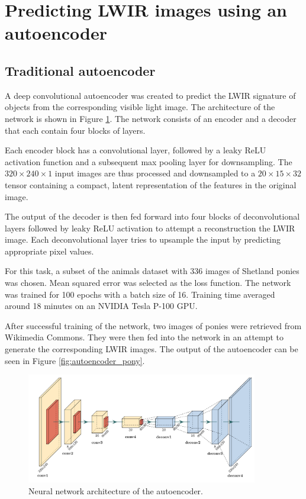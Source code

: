 \documentclass{l4proj}
\begin{document}


\section{Predicting LWIR images using an autoencoder}
\label{autoencoder_implementation}

\subsection{Traditional autoencoder}

A deep convolutional autoencoder was created to predict the LWIR signature of objects from the corresponding visible light image. The architecture of the network is shown in Figure \ref{fig:autoencoder_architecture}. The network consists of an encoder and a decoder that each contain four blocks of layers.

Each encoder block has a convolutional layer, followed by a leaky ReLU activation function and a subsequent max pooling layer for downsampling. The $320 \times 240 \times 1$ input images are thus processed and downsampled to a $20 \times 15 \times 32$ tensor containing a compact, latent representation of the features in the original image.

The output of the decoder is then fed forward into four blocks of deconvolutional layers followed by leaky ReLU activation to attempt a reconstruction the LWIR image. Each deconvolutional layer tries to upsample the input by predicting appropriate pixel values.

For this task, a subset of the animals dataset with 336 images of Shetland ponies was chosen. Mean squared error was selected as the loss function. The network was trained for 100 epochs with a batch size of 16. Training time averaged around 18 minutes on an NVIDIA Tesla P-100 GPU.

After successful training of the network, two images of ponies were retrieved from Wikimedia Commons. They were then fed into the network in an attempt to generate the corresponding LWIR images. The output of the autoencoder can be seen in Figure \ref{fig:autoencoder_pony}.

\begin{figure}[ht]
  \centering
  \includegraphics[width=0.9\textwidth]{images/autoencoder/autoencoder}
  \caption{Neural network architecture of the autoencoder.}
  \label{fig:autoencoder_architecture}
\end{figure}
\end{document}
